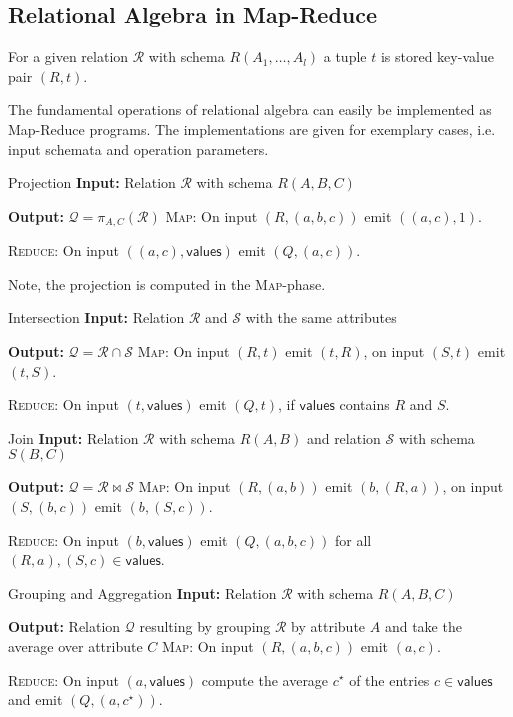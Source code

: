 \documentclass[english]{panikzettel}
\begin{document}

\subsection{Relational Algebra in Map-Reduce}
For a given relation $\mathcal{R}$ with schema $R(A_1, \ldots, A_l)$ a tuple $t$ is stored key-value pair $(R,t)$.

The fundamental operations of relational algebra can easily be implemented as Map-Reduce programs. The implementations are given for exemplary cases, i.e. input schemata and operation parameters.

\begin{algo}{Projection}
\textbf{Input:} Relation $\mathcal{R}$ with schema $R(A,B,C)$

\textbf{Output:} $\mathcal{Q} = \pi_{A,C}(\mathcal{R})$
\tcblower
\textsc{Map}: On input $(R,(a,b,c))$ emit $((a,c),1)$.

\textsc{Reduce}: On input $((a,c), \textsf{values})$ emit $(Q,(a,c))$.
\end{algo}

Note, the projection is computed in the \textsc{Map}-phase.

\begin{algo}{Intersection}
\textbf{Input:} Relation $\mathcal{R}$ and $\mathcal{S}$ with the same attributes

\textbf{Output:} $\mathcal{Q} = \mathcal{R} \cap \mathcal{S}$
\tcblower
\textsc{Map}: On input $(R,t)$ emit $(t,R)$, on input $(S,t)$ emit $(t,S)$.

\textsc{Reduce}: On input $(t, \textsf{values})$ emit $(Q,t)$, if $\textsf{values}$ contains $R$ and $S$.
\end{algo}

\begin{algo}{Join}
\textbf{Input:} Relation $\mathcal{R}$ with schema $R(A,B)$ and relation $\mathcal{S}$ with schema $S(B,C)$

\textbf{Output:} $\mathcal{Q} = \mathcal{R} \bowtie \mathcal{S}$
\tcblower
\textsc{Map}: On input $(R,(a,b))$ emit $(b,(R,a))$, on input $(S,(b,c))$ emit $(b,(S,c))$.

\textsc{Reduce}: On input $(b, \textsf{values})$ emit $(Q,(a,b,c))$ for all $(R,a),(S,c) \in \textsf{values}$.
\end{algo}

\begin{algo}{Grouping and Aggregation}
\textbf{Input:} Relation $\mathcal{R}$ with schema $R(A,B,C)$

\textbf{Output:} Relation $\mathcal{Q}$ resulting by grouping $\mathcal{R}$ by attribute $A$ and take the average over attribute $C$
\tcblower
\textsc{Map}: On input $(R,(a,b,c))$ emit $(a,c)$.

\textsc{Reduce}: On input $(a, \textsf{values})$ compute the average $c^\star$ of the entries $c \in \textsf{values}$ and emit $(Q,(a,c^\star))$.
\end{algo}
\end{document}
